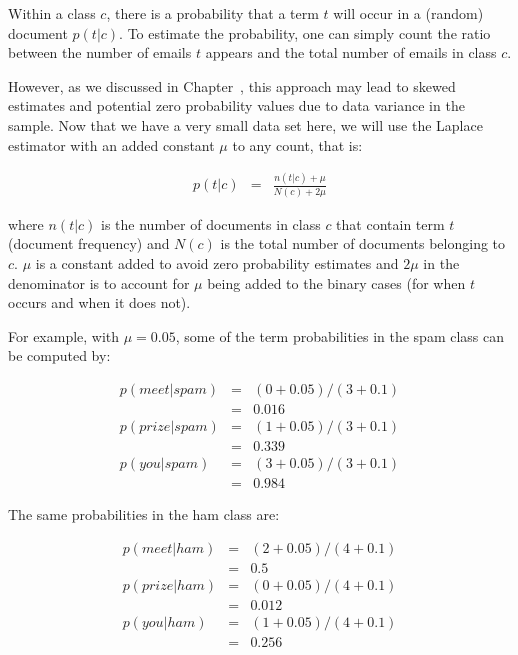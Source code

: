 \documentclass[
  letterpaper,
]{scrbook}
\begin{document}
\protect{}\label{tab-text-emails_bin}{}

Within a class \(c\), there is a probability that a term \(t\) will
occur in a (random) document \(p(t|c)\). To estimate the probability,
one can simply count the ratio between the number of emails \(t\)
appears and the total number of emails in class \(c\).

However, as we discussed in Chapter~, this approach may lead to skewed
estimates and potential zero probability values due to data variance in
the sample. Now that we have a very small data set here, we will use the
Laplace estimator with an added constant \(\mu\) to any count, that is:

\[\begin{aligned}
  p(t|c) & = & \frac{n(t|c)+\mu}{N(c)+2\mu}
\end{aligned}\]

where \(n(t|c)\) is the number of documents in class \(c\) that contain
term \(t\) (document frequency) and \(N(c)\) is the total number of
documents belonging to \(c\). \(\mu\) is a constant added to avoid zero
probability estimates and \(2\mu\) in the denominator is to account for
\(\mu\) being added to the binary cases (for when \(t\) occurs and when
it does not).

For example, with \(\mu=0.05\), some of the term probabilities in the
spam class can be computed by:

\[\begin{aligned}
  p(meet|spam)  & = & (0+0.05)/(3+0.1) \\
                & = & 0.016 \\
  p(prize|spam) & = & (1+0.05)/(3+0.1) \\
                & = & 0.339 \\
  p(you|spam)   & = & (3+0.05)/(3+0.1) \\
                & = & 0.984
\end{aligned}\]

The same probabilities in the ham class are:

\[\begin{aligned}
  p(meet|ham)  & = & (2+0.05)/(4+0.1)  \\
                & = & 0.5 \\
  p(prize|ham) & = & (0+0.05)/(4+0.1) \\
                & = & 0.012 \\
  p(you|ham)   & = & (1+0.05)/(4+0.1) \\
                & = & 0.256
\end{aligned}\]
\end{document}
